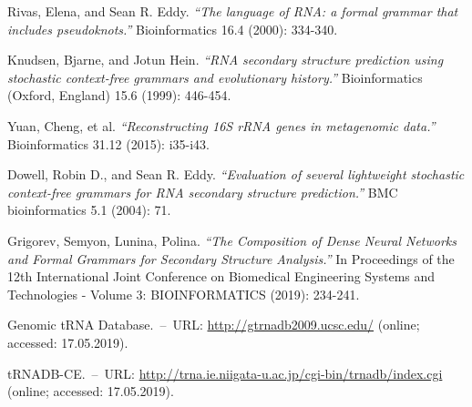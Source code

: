 \documentclass[12pt]{article}  %
\theoremstyle{definition}
\theoremstyle{remark}
\begin{document}
\begin{thebibliography}{7}

Rivas, Elena, and Sean R. Eddy. \emph{``The language of RNA: a formal grammar that includes pseudoknots.''} Bioinformatics 16.4 (2000): 334-340.

Knudsen, Bjarne, and Jotun Hein. \emph{``RNA secondary structure prediction using stochastic context-free grammars and evolutionary history.''} Bioinformatics (Oxford, England) 15.6 (1999): 446-454.

Yuan, Cheng, et al. \emph{``Reconstructing 16S rRNA genes in metagenomic data.''} Bioinformatics 31.12 (2015): i35-i43.

Dowell, Robin D., and Sean R. Eddy. \emph{``Evaluation of several lightweight stochastic context-free grammars for RNA secondary structure prediction.''} BMC bioinformatics 5.1 (2004): 71.

Grigorev, Semyon, Lunina, Polina. \emph{``The Composition of Dense Neural Networks and Formal Grammars for Secondary Structure Analysis.''} In Proceedings of the 12th International Joint Conference on Biomedical Engineering Systems and Technologies - Volume 3: BIOINFORMATICS (2019): 234-241.

Genomic tRNA Database.~--~URL: \url{http://gtrnadb2009.ucsc.edu/} (online; accessed: 17.05.2019).

tRNADB-CE.~--~URL: \url{http://trna.ie.niigata-u.ac.jp/cgi-bin/trnadb/index.cgi} (online; accessed: 17.05.2019).

\end{thebibliography}
\end{document}
